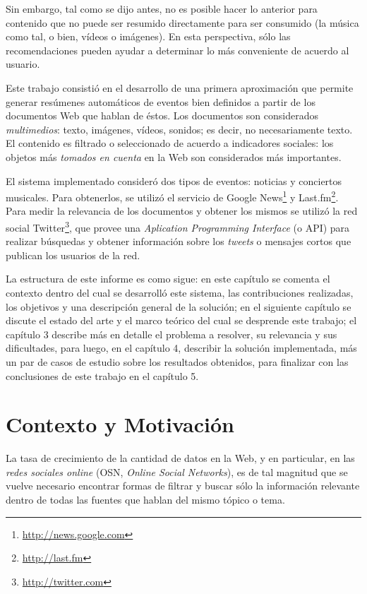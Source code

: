   Sin embargo, tal como se dijo antes, no es posible hacer lo anterior
  para contenido que no puede ser resumido directamente para ser
  consumido (la música como tal, o bien, vídeos o imágenes). En esta
  perspectiva, sólo las recomendaciones pueden ayudar a determinar lo
  más conveniente de acuerdo al usuario.

  Este trabajo consistió en el desarrollo de una primera aproximación
  que permite generar resúmenes automáticos de eventos bien definidos
  a partir de los documentos Web que hablan de éstos. Los documentos son
  considerados \emph{multimedios}: texto, imágenes, vídeos, sonidos; es
  decir, no necesariamente texto. El contenido es filtrado o
  seleccionado de acuerdo a indicadores sociales: los objetos más
  \emph{tomados en cuenta} en la Web son considerados más importantes.

  El sistema implementado consideró dos tipos de eventos: noticias y
  conciertos musicales. Para obtenerlos, se utilizó el servicio de
  Google News\footnote{\href{http://news.google.com}{http://news.google.com} } y
  Last.fm\footnote{\href{http://last.fm}{http://last.fm} }. Para medir la relevancia de los
  documentos y obtener los mismos se utilizó la red social
  Twitter\footnote{\href{http://twitter.com}{http://twitter.com} }, que provee una
  \emph{Aplication Programming Interface} (o API) para realizar búsquedas y
  obtener información sobre los \emph{tweets} o mensajes cortos que publican
  los usuarios de la red.

  La estructura de este informe es como sigue: en este capítulo se
  comenta el contexto dentro del cual se desarrolló este sistema, las
  contribuciones realizadas, los objetivos y una descripción general
  de la solución; en el siguiente capítulo se discute el estado del
  arte y el marco teórico del cual se desprende este trabajo; el
  capítulo 3 describe más en detalle el problema a resolver, su
  relevancia y sus dificultades, para luego, en el
  capítulo 4, describir la solución implementada, más un par de casos
  de estudio sobre los resultados obtenidos, para finalizar con las
  conclusiones de este trabajo en el capítulo 5.

\section{Contexto y Motivación}
\label{sec-1.1}


   La tasa de crecimiento de la cantidad de datos en la Web, y en
   particular, en las \emph{redes sociales online} (OSN, \emph{Online Social Networks}),
   es de tal magnitud que se vuelve necesario encontrar formas de
   filtrar y buscar sólo la información relevante dentro de todas las
   fuentes que hablan del mismo tópico o tema.

